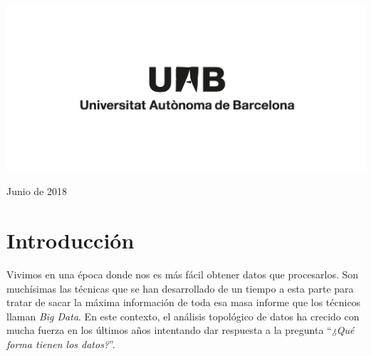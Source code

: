 \documentclass[12pt,a4paper,twoside]{article} %
\theoremstyle{plain}
\theoremstyle{definition}
\newcommand*\NewPage{\newpage\null\thispagestyle{empty}\newpage}
\begin{document}
\begin{titlepage}

	
	\vfill\vfill
    \includegraphics[scale=0.3]{img/uabnegro.png} %
	 
	
	
	\vfill\vfill %
	
	{\large Junio de 2018} %
	
	
	\vfill %
	
\end{titlepage}
\NewPage
\tableofcontents
\NewPage

\newpage
\cleardoublepage
\setcounter{page}{1}
\section{Introducción}

%
%

Vivimos en una época donde nos es más fácil obtener datos que procesarlos. Son muchísimas las técnicas que se han desarrollado de un tiempo a esta parte para tratar de sacar la máxima información de toda esa masa informe que los técnicos llaman \emph{Big Data}. En este contexto, el análisis topológico de datos ha crecido con mucha fuerza en los últimos años intentando dar respuesta a la pregunta ``\emph{¿Qué forma tienen los datos?}''.
\end{document}
